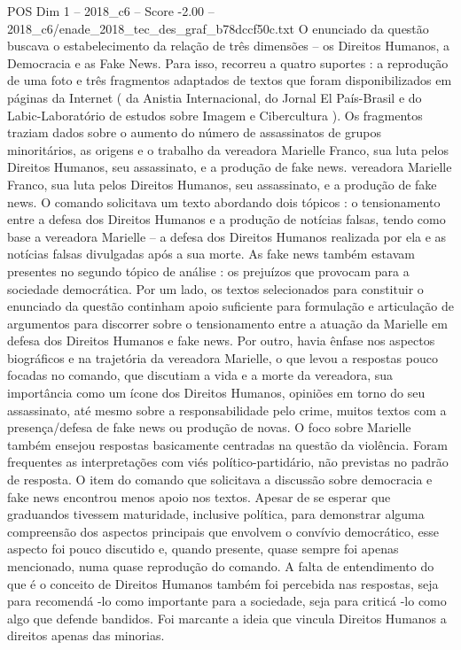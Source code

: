 \begin{textsample}{POS Dim 1 – 2018\_c6 – Score -2.00 – 2018\_c6/enade\_2018\_tec\_des\_graf\_b78dccf50c.txt}
O enunciado da questão buscava o estabelecimento da relação de três dimensões – os Direitos Humanos, a Democracia e as Fake News.
Para isso, recorreu a quatro suportes : a reprodução de uma foto e três fragmentos adaptados de textos que foram disponibilizados em páginas da Internet ( da Anistia Internacional, do Jornal El País-Brasil e do Labic-Laboratório de estudos sobre Imagem e Cibercultura ).
Os fragmentos traziam dados sobre o aumento do número de assassinatos de grupos minoritários, as origens e o trabalho da vereadora Marielle Franco, sua luta pelos Direitos Humanos, seu assassinato, e a produção de fake news. vereadora Marielle Franco, sua luta pelos Direitos Humanos, seu assassinato, e a produção de fake news.
O comando solicitava um texto abordando dois tópicos : o tensionamento entre a defesa dos Direitos Humanos e a produção de notícias falsas, tendo como base a vereadora Marielle – a defesa dos Direitos Humanos realizada por ela e as notícias falsas divulgadas após a sua morte.
As fake news também estavam presentes no segundo tópico de análise : os prejuízos que provocam para a sociedade democrática.
Por um lado, os textos selecionados para constituir o enunciado da questão continham apoio suficiente para formulação e articulação de argumentos para discorrer sobre o tensionamento entre a atuação da Marielle em defesa dos Direitos Humanos e fake news.
Por outro, havia ênfase nos aspectos biográficos e na trajetória da vereadora Marielle, o que levou a respostas pouco focadas no comando, que discutiam a vida e a morte da vereadora, sua importância como um ícone dos Direitos Humanos, opiniões em torno do seu assassinato, até mesmo sobre a responsabilidade pelo crime, muitos textos com a presença/defesa de fake news ou produção de novas.
O foco sobre Marielle também ensejou respostas basicamente centradas na questão da violência.
Foram frequentes as interpretações com viés político-partidário, não previstas no padrão de resposta.
O item do comando que solicitava a discussão sobre democracia e fake news encontrou menos apoio nos textos.
Apesar de se esperar que graduandos tivessem maturidade, inclusive política, para demonstrar alguma compreensão dos aspectos principais que envolvem o convívio democrático, esse aspecto foi pouco discutido e, quando presente, quase sempre foi apenas mencionado, numa quase reprodução do comando.
A falta de entendimento do que é o conceito de Direitos Humanos também foi percebida nas respostas, seja para recomendá -lo como importante para a sociedade, seja para criticá -lo como algo que defende bandidos.
Foi marcante a ideia que vincula Direitos Humanos a direitos apenas das minorias.

\end{textsample}
